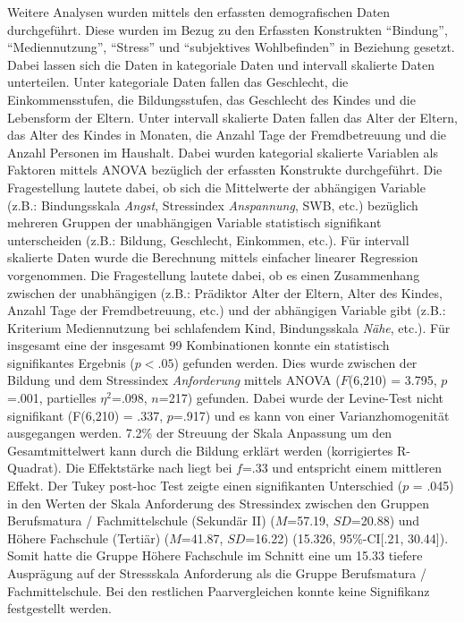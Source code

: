 Weitere Analysen wurden mittels den erfassten demografischen Daten durchgeführt. Diese wurden im Bezug zu den Erfassten Konstrukten \enquote{Bindung}, \enquote{Mediennutzung}, \enquote{Stress} und \enquote{subjektives Wohlbefinden} in Beziehung gesetzt. Dabei lassen sich die Daten in kategoriale Daten und intervall skalierte Daten unterteilen. Unter kategoriale Daten fallen das Geschlecht, die Einkommensstufen, die Bildungsstufen, das Geschlecht des Kindes und die Lebensform der Eltern. Unter intervall skalierte Daten fallen das Alter der Eltern, das Alter des Kindes in Monaten, die Anzahl Tage der Fremdbetreuung und die Anzahl Personen im Haushalt. Dabei wurden kategorial skalierte Variablen als Faktoren mittels ANOVA bezüglich der erfassten Konstrukte durchgeführt. Die Fragestellung lautete dabei, ob sich die Mittelwerte der abhängigen Variable (z.B.: Bindungsskala \textit{Angst}, Stressindex \textit{Anspannung}, SWB, etc.) bezüglich mehreren Gruppen der unabhängigen Variable statistisch signifikant unterscheiden  (z.B.: Bildung, Geschlecht, Einkommen, etc.). Für intervall skalierte Daten wurde die Berechnung mittels einfacher linearer Regression vorgenommen. Die Fragestellung lautete dabei, ob es einen Zusammenhang zwischen der unabhängigen (z.B.: Prädiktor Alter der Eltern, Alter des Kindes, Anzahl Tage der Fremdbetreuung, etc.) und der abhängigen Variable gibt (z.B.: Kriterium Mediennutzung bei schlafendem Kind, Bindungsskala \textit{Nähe}, etc.). Für insgesamt eine der insgesamt 99 Kombinationen konnte ein statistisch signifikantes Ergebnis ($p<.05$) gefunden werden. Dies wurde zwischen der Bildung und dem Stressindex \textit{Anforderung} mittels ANOVA ($F$(6,210) = 3.795, $p$=.001, partielles $\eta^2$=.098, $n$=217) gefunden. Dabei wurde der Levine-Test nicht signifikant (F(6,210) = .337, $p$=.917) und es kann von einer Varianzhomogenität ausgegangen werden. 7.2\% der Streuung der Skala Anpassung um den Gesamtmittelwert kann durch die Bildung erklärt werden (korrigiertes R-Quadrat). Die Effektstärke nach  liegt bei $f$=.33 und entspricht einem mittleren Effekt. Der Tukey post-hoc Test zeigte einen signifikanten Unterschied ($p$ = .045) in den Werten der Skala Anforderung des Stressindex zwischen den Gruppen Berufsmatura / Fachmittelschule (Sekundär II) ($M$=57.19, $SD$=20.88) und Höhere Fachschule (Tertiär) ($M$=41.87, $SD$=16.22) (15.326, 95\%-CI[.21, 30.44]). Somit hatte die Gruppe Höhere Fachschule im Schnitt eine um 15.33 tiefere Ausprägung auf der Stressskala Anforderung als die Gruppe Berufsmatura / Fachmittelschule. Bei den restlichen Paarvergleichen konnte keine Signifikanz festgestellt werden.

